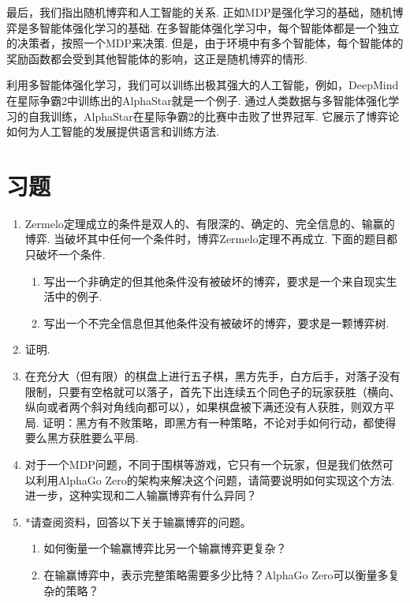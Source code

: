 最后，我们指出随机博弈和人工智能的关系. 正如MDP是强化学习的基础，随机博弈是多智能体强化学习的基础. 在多智能体强化学习中，每个智能体都是一个独立的决策者，按照一个MDP来决策. 但是，由于环境中有多个智能体，每个智能体的奖励函数都会受到其他智能体的影响，这正是随机博弈的情形. 

利用多智能体强化学习，我们可以训练出极其强大的人工智能，例如，DeepMind在星际争霸2中训练出的AlphaStar就是一个例子. 通过人类数据与多智能体强化学习的自我训练，AlphaStar在星际争霸2的比赛中击败了世界冠军. 它展示了博弈论如何为人工智能的发展提供语言和训练方法. 

\section{习题}
\begin{enumerate}[wide, labelindent=0pt]
    \item \label{exercise:zermelo-fail} Zermelo定理成立的条件是双人的、有限深的、确定的、完全信息的、输赢的博弈. 当破坏其中任何一个条件时，博弈Zermelo定理不再成立. 下面的题目都只破坏一个条件.
    \begin{enumerate}
        \item 写出一个非确定的但其他条件没有被破坏的博弈，要求是一个来自现实生活中的例子.
        \item 写出一个不完全信息但其他条件没有被破坏的博弈，要求是一颗博弈树.
    \end{enumerate}

    \item \label{exercise:zermelo-draw} 证明.

    \item \label{exercise:gomoku} 在充分大（但有限）的棋盘上进行五子棋，黑方先手，白方后手，对落子没有限制，只要有空格就可以落子，首先下出连续五个同色子的玩家获胜（横向、纵向或者两个斜对角线向都可以），如果棋盘被下满还没有人获胜，则双方平局. 证明：黑方有不败策略，即黑方有一种策略，不论对手如何行动，都使得要么黑方获胜要么平局.
    
    \item 对于一个MDP问题，不同于围棋等游戏，它只有一个玩家，但是我们依然可以利用AlphaGo Zero的架构来解决这个问题，请简要说明如何实现这个方法. 进一步，这种实现和二人输赢博弈有什么异同？
    
    \item *请查阅资料，回答以下关于输赢博弈的问题。
    \begin{enumerate}
        \item 如何衡量一个输赢博弈比另一个输赢博弈更复杂？
        \item 在输赢博弈中，表示完整策略需要多少比特？AlphaGo Zero可以衡量多复杂的策略？
    \end{enumerate}
    

\end{enumerate}
